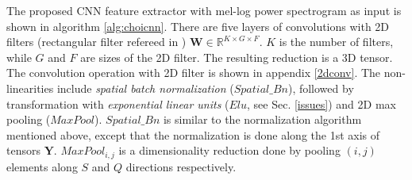 \noindent The proposed CNN feature extractor with mel-log power spectrogram as input is shown in algorithm \ref{alg:choicnn}. There are five layers of convolutions with 2D filters (rectangular filter refereed in \cite{MusicMotive}) $\textbf{W} \in \mathbb{R}^{K \times G \times F}$. $K$ is the number of filters, while $G$ and $F$ are sizes of the 2D filter. The resulting reduction is a 3D tensor. The convolution operation with 2D filter is shown in appendix \ref{2dconv}. The non-linearities include \textit{spatial batch normalization} ($Spatial\_Bn$), followed by transformation with \textit{exponential linear units} ($Elu$, see Sec. \ref{issues}) and 2D max pooling ($MaxPool$). $Spatial\_Bn$ is similar to the normalization algorithm mentioned above, except that the normalization is done along the 1st axis of tensors $\textbf{Y}$. $MaxPool_{i,j}$ is a dimensionality reduction done by pooling $(i,j)$ elements along $S$ and $Q$ directions respectively.  

